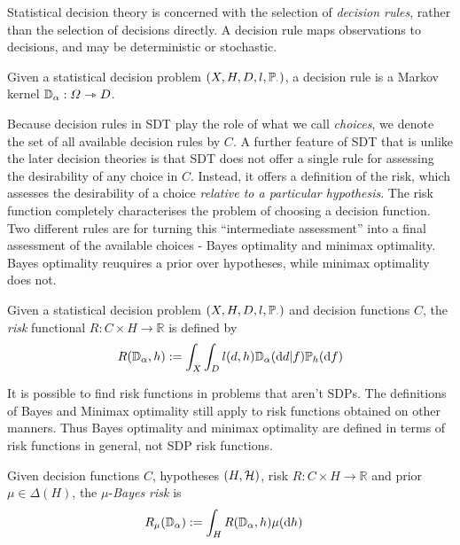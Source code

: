 Statistical decision theory is concerned with the selection of \emph{decision rules}, rather than the selection of decisions directly. A decision rule maps observations to decisions, and may be deterministic or stochastic.

\begin{definition}
Given a statistical decision problem $(X, H, D, l, \mathbb{P}_\cdot)$, a decision rule is a Markov kernel $\mathbb{D}_\alpha:\Omega\rightarrowtriangle D$.
\end{definition}

Because decision rules in SDT play the role of what we call \emph{choices}, we denote the set of all available decision rules by $C$. A further feature of SDT that is unlike the later decision theories is that SDT does not offer a single rule for assessing the desirability of any choice in $C$. Instead, it offers a definition of the risk, which assesses the desirability of a choice \emph{relative to a particular hypothesis}. The risk function completely characterises the problem of choosing a decision function. Two different rules are for turning this ``intermediate assessment'' into a final assessment of the available choices - Bayes optimality and minimax optimality. Bayes optimality reuquires a prior over hypotheses, while minimax optimality does not.

\begin{definition}\label{def:risk}
Given a statistical decision problem $(X, H, D, l, \mathbb{P}_\cdot)$ and decision functions $C$, the \emph{risk} functional $R:C\times H\to \mathbb{R}$ is defined by
\begin{align}
    R(\mathbb{D}_\alpha,h):= \int_X \int_D l(d,h) \mathbb{D}_\alpha(\mathrm{d}d|f)\mathbb{P}_h(\mathrm{d}f)
\end{align}
\end{definition}

It is possible to find risk functions in problems that aren't SDPs. The definitions of Bayes and Minimax optimality still apply to risk functions obtained on other manners. Thus Bayes optimality and minimax optimality are defined in terms of risk functions in general, not SDP risk functions.

\begin{definition}
Given decision functions $C$, hypotheses $(H,\mathcal{H})$, risk $R:C\times H\to \mathbb{R}$ and prior $\mu\in \Delta(H)$, the $\mu$-\emph{Bayes risk} is
\begin{align}
    R_\mu(\mathbb{D}_\alpha) &:= \int_{H} R(\mathbb{D}_\alpha,h)\mu(\mathrm{d}h)
\end{align}
\end{definition}

